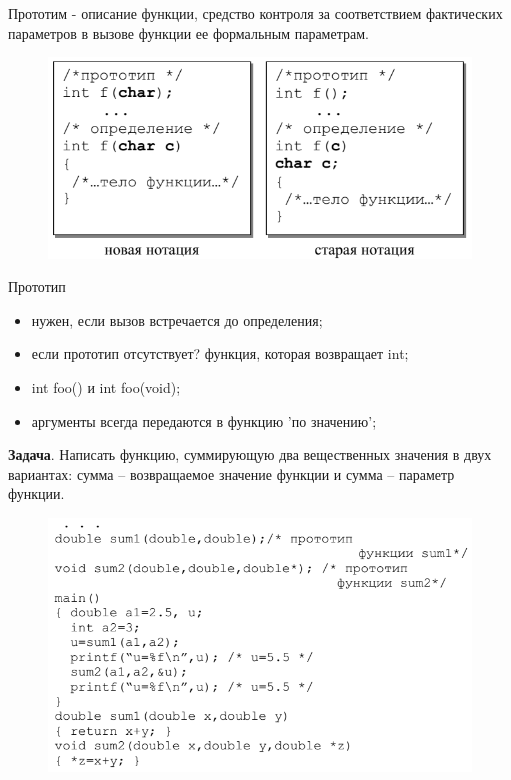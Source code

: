 \documentclass{beamer}
\begin{document}
\begin{frame}
Прототим - описание функции, средство контроля за соответствием фактических параметров в вызове функции ее формальным параметрам.
\begin{figure}[h]
\centering
\includegraphics[scale=0.5]{images/lec03-pic02.png}
\end{figure}
Прототип 
\begin{itemize}
\item нужен, если вызов встречается до определения;
\item если прототип отсутствует? функция, которая возвращает int;
\item int foo() и int foo(void);
\item аргументы всегда передаются в функцию 'по значению';
\end{itemize}
\end{frame}

\begin{frame}
\textbf{Задача}. Написать функцию, суммирующую два вещественных значения в двух вариантах: сумма – возвращаемое значение функции и сумма – параметр функции.
\begin{figure}[h]
\centering
\includegraphics[scale=0.5]{images/lec03-pic03.png}
\end{figure}
\end{frame}
\end{document}
